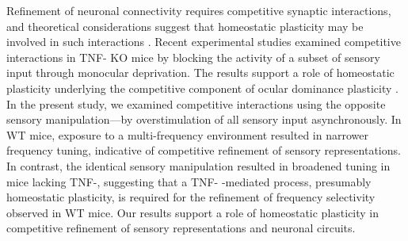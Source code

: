 Refinement of neuronal connectivity requires competitive synaptic interactions, and theoretical considerations suggest that homeostatic plasticity may be involved in such interactions \cite{Davis2001, Burrone2003, Turrigiano2004}. Recent experimental studies examined competitive interactions in TNF-\textalpha{} KO mice by blocking the activity of a subset of sensory input through monocular deprivation. The results support a role of homeostatic plasticity underlying the competitive component of ocular dominance plasticity \cite{Kaneko2008, Ranson2012}. In the present study, we examined competitive interactions using the opposite sensory manipulation---by overstimulation of all sensory input asynchronously. In WT mice, exposure to a multi-frequency environment resulted in narrower frequency tuning, indicative of competitive refinement of sensory representations. In contrast, the identical sensory manipulation resulted in broadened tuning in mice lacking TNF-\textalpha{}, suggesting that a TNF-\textalpha{} -mediated process, presumably homeostatic plasticity, is required for the refinement of frequency selectivity observed in WT mice. Our results support a role of homeostatic plasticity in competitive refinement of sensory representations and neuronal circuits.

